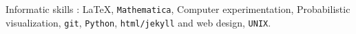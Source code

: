 \documentclass[letterpaper,11pt]{article}
\begin{document}










\medskip

Informatic skills : \LaTeX, \texttt{Mathematica}, Computer experimentation,
Probabilistic visualization, \texttt{git}, \texttt{Python},
\texttt{html/jekyll} and web design, \texttt{UNIX}.
\end{document}
